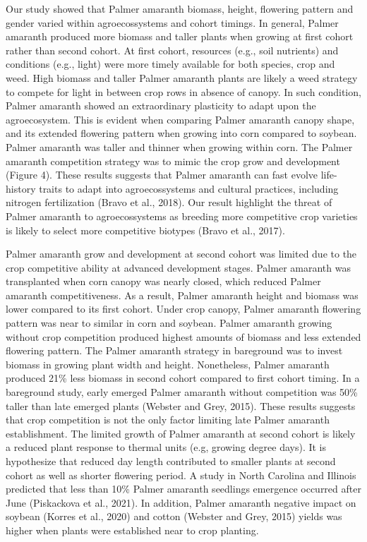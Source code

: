 \documentclass[utf8]{frontiersSCNS}
\begin{document}
Our study showed that Palmer amaranth biomass, height, flowering pattern
and gender varied within agroecossystems and cohort timings. In general,
Palmer amaranth produced more biomass and taller plants when growing at
first cohort rather than second cohort. At first cohort, resources
(e.g., soil nutrients) and conditions (e.g., light) were more timely
available for both species, crop and weed. High biomass and taller
Palmer amaranth plants are likely a weed strategy to compete for light
in between crop rows in absence of canopy. In such condition, Palmer
amaranth showed an extraordinary plasticity to adapt upon the
agroecosystem. This is evident when comparing Palmer amaranth canopy
shape, and its extended flowering pattern when growing into corn
compared to soybean. Palmer amaranth was taller and thinner when growing
within corn. The Palmer amaranth competition strategy was to mimic the
crop grow and development (Figure 4). These results suggests that Palmer
amaranth can fast evolve life-history traits to adapt into
agroecossystems and cultural practices, including nitrogen fertilization
(Bravo et al., 2018). Our result highlight the threat of Palmer amaranth
to agroecossystems as breeding more competitive crop varieties is likely
to select more competitive biotypes (Bravo et al., 2017).

Palmer amaranth grow and development at second cohort was limited due to
the crop competitive ability at advanced development stages. Palmer
amaranth was transplanted when corn canopy was nearly closed, which
reduced Palmer amaranth competitiveness. As a result, Palmer amaranth
height and biomass was lower compared to its first cohort. Under crop
canopy, Palmer amaranth flowering pattern was near to similar in corn
and soybean. Palmer amaranth growing without crop competition produced
highest amounts of biomass and less extended flowering pattern. The
Palmer amaranth strategy in bareground was to invest biomass in growing
plant width and height. Nonetheless, Palmer amaranth produced 21\% less
biomass in second cohort compared to first cohort timing. In a
bareground study, early emerged Palmer amaranth without competition was
50\% taller than late emerged plants (Webster and Grey, 2015). These
results suggests that crop competition is not the only factor limiting
late Palmer amaranth establishment. The limited growth of Palmer
amaranth at second cohort is likely a reduced plant response to thermal
units (e.g, growing degree days). It is hypothesize that reduced day
length contributed to smaller plants at second cohort as well as shorter
flowering period. A study in North Carolina and Illinois predicted that
less than 10\% Palmer amaranth seedlings emergence occurred after June
(Piskackova et al., 2021). In addition, Palmer amaranth negative impact
on soybean (Korres et al., 2020) and cotton (Webster and Grey, 2015)
yields was higher when plants were established near to crop planting.
\end{document}
